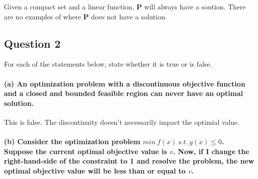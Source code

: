 \documentclass[11pt]{article}
\begin{document}
Given a compact set and a linear function, \(\mathbf{P}\) will always
have a soution. There are no examples of where \(\mathbf{P}\) does not
have a solution.

    \hypertarget{question-2}{%
\subsection{Question 2}\label{question-2}}

For each of the statements below, state whether it is true or is false.

\hypertarget{a-an-optimization-problem-with-a-discontinuous-objective-function-and-a-closed-and-bounded-feasible-region-can-never-have-an-optimal-solution.}{%
\paragraph{(a) An optimization problem with a discontinuous objective
function and a closed and bounded feasible region can never have an
optimal
solution.}\label{a-an-optimization-problem-with-a-discontinuous-objective-function-and-a-closed-and-bounded-feasible-region-can-never-have-an-optimal-solution.}}

This is false. The discontinuity doesn't necessarily impact the optimial
value.

\hypertarget{b-consider-the-optimization-problem-min-fx-s.t.-gx-le-0.-suppose-the-current-optimal-objective-value-is-v.-now-if-i-change-the-right-hand-side-of-the-constraint-to-1-and-resolve-the-problem-the-new-optimal-objective-value-will-be-less-than-or-equal-to-v.}{%
\paragraph{\texorpdfstring{(b) Consider the optimization problem
\(min \ f(x) \ s.t. \ g(x) \le 0\). Suppose the current optimal
objective value is \(v\). Now, if I change the right-hand-side of the
constraint to 1 and resolve the problem, the new optimal objective value
will be less than or equal to
\(v\).}{(b) Consider the optimization problem min \textbackslash{} f(x) \textbackslash{} s.t. \textbackslash{} g(x) \textbackslash{}le 0. Suppose the current optimal objective value is v. Now, if I change the right-hand-side of the constraint to 1 and resolve the problem, the new optimal objective value will be less than or equal to v.}}\label{b-consider-the-optimization-problem-min-fx-s.t.-gx-le-0.-suppose-the-current-optimal-objective-value-is-v.-now-if-i-change-the-right-hand-side-of-the-constraint-to-1-and-resolve-the-problem-the-new-optimal-objective-value-will-be-less-than-or-equal-to-v.}}
\end{document}
